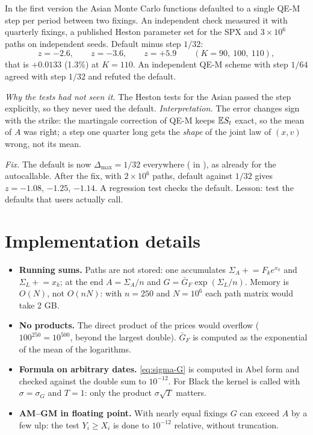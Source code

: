 \begin{progetto}[title={In the qpricer project: a bug found and fixed}]
In the first version the Asian Monte Carlo functions defaulted to a single QE-M step per period between two fixings.
An independent check measured it with quarterly fixings, a published Heston parameter set for the SPX and $3\times10^6$
paths on independent seeds. Default minus step $1/32$:
\[
z=-2.6,\qquad z=-3.6,\qquad z=+5.9\qquad(K=90,\ 100,\ 110),
\]
that is $+0.0133$ (1.3\%) at $K=110$. An independent QE-M scheme with step $1/64$ agreed with step $1/32$ and refuted
the default.

\smallskip
\emph{Why the tests had not seen it.} The Heston tests for the Asian passed the step explicitly, so they never used the
default. \emph{Interpretation.} The error changes sign with the strike: the martingale correction of QE-M keeps
$\mathbb{E} S_t$ exact, so the mean of $A$ was right; a step one quarter long gets the \emph{shape} of the joint law of
$(x,v)$ wrong, not its mean.

\smallskip
\emph{Fix.} The default is now $\Delta_{\max}=1/32$ everywhere ( in
), as already for the autocallable. After the fix, with $2\times10^6$ paths,
default against $1/32$ gives $z=-1.08$, $-1.25$, $-1.14$. A regression test checks the default. Lesson: test the
defaults that users actually call.
\end{progetto}

\section{Implementation details}
\begin{itemize}
\item \textbf{Running sums.} Paths are not stored: one accumulates $\Sigma_A\mathrel{+}=F_ke^{x_k}$ and
$\Sigma_L\mathrel{+}=x_k$; at the end $A=\Sigma_A/n$ and $G=\bar G_F\exp(\Sigma_L/n)$. Memory is $O(N)$, not $O(nN)$:
with $n=250$ and $N=10^6$ each path matrix would take 2 GB.
\item \textbf{No products.} The direct product of the prices would overflow ($100^{250}=10^{500}$, beyond the largest
double). $\bar G_F$ is computed as the exponential of the mean of the logarithms.
\item \textbf{Formula on arbitrary dates.} \eqref{eq:sigma-G} is computed in Abel form and checked against the double
sum to $10^{-12}$. For Black the kernel is called with $\sigma=\sigma_G$ and $T=1$: only the product $\sigma\sqrt T$
matters.
\item \textbf{AM--GM in floating point.} With nearly equal fixings $G$ can exceed $A$ by a few ulp: the test
$Y_i\ge X_i$ is done to $10^{-12}$ relative, without truncation.
\end{itemize}


